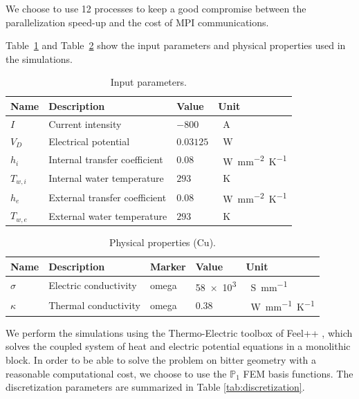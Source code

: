 \documentclass[12pt]{article}
\begin{document}
We choose to use 12 processes to keep a good compromise between the parallelization
speed-up and the cost of MPI communications.

Table~\ref{tab:input_parameters} and Table~\ref{tab:physical_properties} show the
input parameters and physical properties used in the simulations.

\begin{table}[H]
  \centering
  \renewcommand{\arraystretch}{1.5} %
  \begin{tabular}{p{1cm}p{6cm}p{2cm}p{2cm}}
    \toprule
    \textbf{Name} & \textbf{Description} & \textbf{Value} & \textbf{Unit} \\
    \midrule
    $I$ & Current intensity & $-800$ & \SI{}{\ampere} \\
    $V_D$ & Electrical potential & $0.03125$ & \SI{}{\watt} \\
    $h_i$ & Internal transfer coefficient & $0.08$ & \SI{}{\watt mm^{-2} \kelvin^{-1}}  \\
    $T_{w,i}$ & Internal water temperature & $293$ & \SI{}{\kelvin} \\
    $h_e$ & External transfer coefficient & $0.08$ & \SI{}{\watt mm^{-2} \kelvin^{-1}} \\
    $T_{w,e}$ & External water temperature & $293$ & \SI{}{\kelvin} \\
    \bottomrule
  \end{tabular}
  \caption{Input parameters.}
  \label{tab:input_parameters}
\end{table}

\begin{table}[H]
  \centering
  \renewcommand{\arraystretch}{1.5} %
  \begin{tabular}{p{1cm}p{5cm}p{3cm}p{2cm}p{2cm}}
    \toprule
    \textbf{Name} & \textbf{Description} & \textbf{Marker} & \textbf{Value} & \textbf{Unit} \\
    \midrule
    $\sigma$ & Electric conductivity & omega & \SI{58e3}{} & \SI{}{\siemens mm^{-1}} \\
    $\kappa$ & Thermal conductivity & omega & $0.38$ & \SI{}{\watt mm^{-1} \kelvin^{-1}} \\
    \bottomrule
  \end{tabular}
  \caption{Physical properties (Cu).}
  \label{tab:physical_properties}
\end{table}

We perform the simulations using the Thermo-Electric toolbox of Feel++
\cite{christophe_prudhomme_feelppfeelpp_2024}, which solves the coupled system of
heat and electric potential equations in a monolithic block.
In order to be able to solve the problem on bitter geometry
with a reasonable computational cost, we choose to use the $\mathbb{P}_1$ FEM
basis functions. The discretization parameters are summarized in Table \ref{tab:discretization}.
\end{document}
